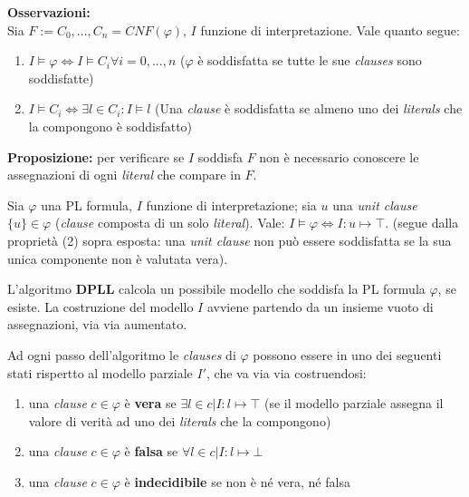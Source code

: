\begin{fdefinition}
\textbf{Osservazioni:}\\
Sia $F := C_0, ..., C_n = CNF (\varphi)$, $I$ funzione di interpretazione. Vale quanto segue:
\begin{enumerate}
\item $I \models \varphi \iff I \models C_i \forall i = 0, ..., n$ ($\varphi$ è soddisfatta se tutte le sue \textit{clauses} sono soddisfatte)
\item $I \models C_i \iff \exists l \in C_i : I \models l$ (Una \textit{clause} è soddisfatta se almeno uno dei \textit{literals} che la compongono è soddisfatto)
\end{enumerate}
\textbf{Proposizione: } per verificare se $I$ soddisfa $F$ non è necessario conoscere le assegnazioni di ogni \textit{literal} che compare in $F$.
\end{fdefinition}

\begin{fdefinition}
Sia $\varphi$ una PL formula, $I$ funzione di interpretazione; sia $u$ una \textit{unit clause} $\lbrace u \rbrace \in \varphi$ (\textit{clause} composta di un solo \textit{literal}). Vale: $I \models \varphi \iff I: u \mapsto \top$. (segue dalla proprietà (2) sopra esposta: una \textit{unit clause} non può essere soddisfatta se la sua unica componente non è valutata vera).
\end{fdefinition}

L'algoritmo \textbf{DPLL} calcola un possibile modello che soddisfa la PL formula $\varphi$, se esiste. La costruzione del modello $I$ avviene partendo da un insieme vuoto di assegnazioni, via via aumentato.

Ad ogni passo dell'algoritmo le \textit{clauses} di $\varphi$ possono essere in uno dei seguenti stati rispertto al modello parziale $I'$, che va via via costruendosi:
\begin{enumerate}
\item una \textit{clause} $c \in \varphi$ è \textbf{vera} se $\exists l \in c | I: l \mapsto \top$ (se il modello parziale assegna il valore di verità ad uno dei \textit{literals} che la compongono)
\item una \textit{clause} $c \in \varphi$ è \textbf{falsa} se $\forall l \in c | I: l \mapsto \bot$
\item una \textit{clause} $c \in \varphi$ è \textbf{indecidibile} se non è né vera, né falsa
\end{enumerate}

